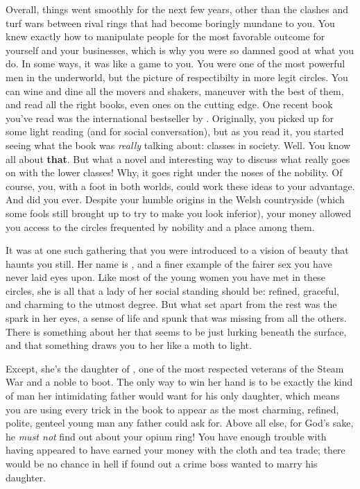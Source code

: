 \documentclass[char]{airship}
\begin{document}
Overall, things went smoothly for the next few years, other than the clashes and turf wars between rival rings that had become boringly mundane to you.  You knew exactly how to manipulate people for the most favorable outcome for yourself and your businesses, which is why you were so damned good at what you do.  In some ways, it was like a game to you.  You were one of the most powerful men in the underworld, but the picture of respectibilty in more legit circles.  You can wine and dine all the movers and shakers, maneuver with the best of them, and read all the right books, even ones on the cutting edge.  One recent book you've read was the international bestseller by \cSaboteur{\intro}.  Originally, you picked up for some light reading (and for social conversation), but as you read it, you started seeing what the book was \textit{really} talking about: classes in society.  Well.  You know all about \textbf{that}.  But what a novel and interesting way to discuss what really goes on with the lower classes!  Why, it goes right under the noses of the nobility.  Of course, you, with a foot in both worlds, could work these ideas to your advantage.  And did you ever.  Despite your humble origins in the Welsh countryside (which some fools still brought up to try to make you look inferior), your money allowed you access to the circles frequented by nobility and a place among them.

It was at one such gathering that you were introduced to a vision of
beauty that haunts you still.  Her name is \cThief{\intro}, and a finer
example of the fairer sex you have never laid eyes upon.  Like most of
the young women you have met in these circles, she is all that a lady
of her social standing should be: refined, graceful, and charming to
the utmost degree.  But what set \cThief{} apart from the rest was the
spark in her eyes, a sense of life and spunk that was missing from all
the others.  There is something about her that seems to be just
lurking beneath the surface, and that something draws you to her like
a moth to light.

Except, she's the daughter of \cCaptain{\intro}, one of the most respected
veterans of the Steam War and a noble to boot.  The only way to win
her hand is to be exactly the kind of man her intimidating father
would want for his only daughter, which means you are using every
trick in the book to appear as the most charming, refined, polite,
genteel young man any father could ask for.  Above all else, for God's
sake, he {\em must not} find out about your opium ring!  You have
enough trouble with having appeared to have earned your money with the
cloth and tea trade; there would be no chance in hell if \cCaptain{}
found out a crime boss wanted to marry his daughter.
\end{document}
